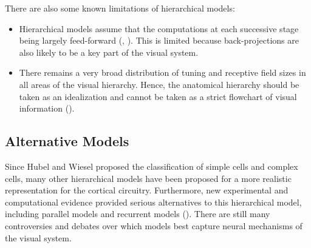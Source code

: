 \par There are also some known limitations of hierarchical models:
\begin{itemize}
    \item Hierarchical models assume that the computations at each successive stage being largely feed-forward (\cite{riesenhuber1999hierarchical}, \cite{dicarlo2012does}). This is limited because back-projections are also likely to be a key part of the visual system. 
    \item There remains a very broad distribution of tuning and receptive field sizes in all areas of the visual hierarchy. Hence, the anatomical hierarchy should be taken as an idealization and cannot be taken as a strict flowchart of visual information (\cite{hegde2007reappraising}). 
\end{itemize}

\subsection{Alternative Models}
\par Since Hubel and Wiesel proposed the classification of simple cells and complex cells, many other hierarchical models have been proposed for a more realistic representation for the cortical circuitry. Furthermore, new experimental and computational evidence provided serious alternatives to this hierarchical model, including parallel models and recurrent models (\cite{martinez_complex_2003}). There are still many controversies and debates over which models best capture neural mechanisms of the visual system.

